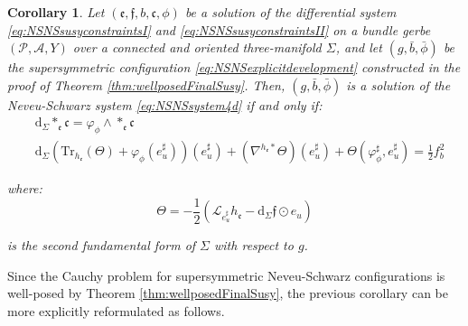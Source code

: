 \documentclass[10pt,reqno,a4paper]{amsart}
\theoremstyle{plain}
\newtheorem{cor}[thm]{Corollary}
\theoremstyle{definition}
\theoremstyle{remark}
\theoremstyle{remark}
\def\dd{\mathrm{d}}
\newcommand{\Tr}{\mathrm{Tr}}
\def\cA{\mathcal{A}}
\def\cP{\mathcal{P}}
\def\cL{\mathcal{L}}
\def\frc{\mathfrak{c}}
\def\cL{\mathcal{L}}
\def\fre{\mathfrak{e}}
\renewcommand{\(}{ (}
\renewcommand{\)}{ )}
\newcommand{\frf}{\mathfrak{f}}
\begin{document}
\begin{cor}
\label{cor:NSNSsusyinitialdata}
Let $(\fre,\frf,b,\frc,\phi)$ be a solution of the differential system \eqref{eq:NSNSsusyconstraintsI} and \eqref{eq:NSNSsusyconstraintsII} on a bundle gerbe $(\cP,\cA,Y)$ over a connected and oriented three-manifold $\Sigma$, and let $(g,\bar{b},\bar{\phi})$ be the supersymmetric configuration \eqref{eq:NSNSexplicitdevelopment} constructed in the proof of Theorem \ref{thm:wellposedFinalSusy}. Then, $(g,\bar{b},\bar{\phi})$ is a solution of the Neveu-Schwarz system \eqref{eq:NSNSsystem4d} if and only if:
\begin{eqnarray}
\label{eq:NSNSsusysolutionconstraints}
& \dd_{\Sigma}\ast_{\fre}\frc = \varphi_{\phi}\wedge\ast_{\fre}\frc \nonumber \\
& \dd_{\Sigma} (\Tr_{h_{\fre}}(\Theta) + \varphi_{\phi}(e^{\sharp}_u))(e^{\sharp}_u) + (\nabla^{h_{\fre}\ast}\Theta)(e^{\sharp}_u) + \Theta(\varphi_{\phi}^{\sharp},e^{\sharp}_u) = \frac{1}{2} f_b^2
\end{eqnarray}

\noindent
where:
\begin{equation*}
\Theta = -\frac{1}{2} (\cL_{e^{\sharp}_u}h_{\fre} - \dd_{\Sigma}\frf\odot e_u)    
\end{equation*}

\noindent
is the second fundamental form of $\Sigma$ with respect to $g$.  
\end{cor}
  
\noindent
Since the Cauchy problem for supersymmetric Neveu-Schwarz configurations is well-posed by Theorem \ref{thm:wellposedFinalSusy}, the previous corollary can be more explicitly reformulated as follows.
\end{document}

